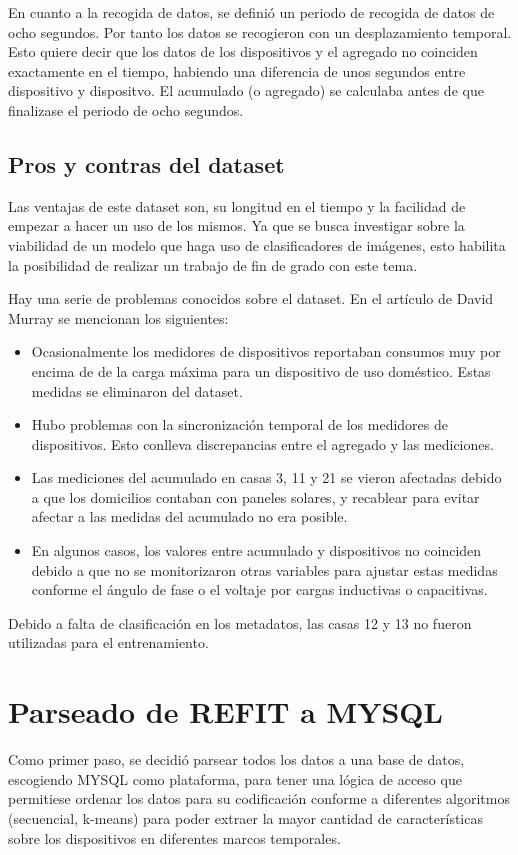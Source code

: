 En cuanto a la recogida de datos, se definió un periodo de recogida de datos de ocho segundos. Por tanto los datos se recogieron con un desplazamiento temporal. Esto quiere decir que los datos de los dispositivos y el agregado no coinciden exactamente en el tiempo, habiendo una diferencia de unos segundos entre dispositivo y dispositvo. El acumulado (o agregado) se calculaba antes de que finalizase el periodo de ocho segundos.


\subsection{Pros y contras del dataset}

Las ventajas de este dataset son, su longitud en el tiempo y la facilidad de empezar a hacer un uso de los mismos. Ya que se busca investigar sobre la viabilidad de un modelo que haga uso de clasificadores de imágenes, esto habilita la posibilidad de realizar un trabajo de fin de grado con este tema. 

Hay una serie de problemas conocidos sobre el dataset. En el artículo de David Murray \autocite{REFIT} se mencionan los siguientes:
\begin{itemize}
    \item Ocasionalmente los medidores de dispositivos reportaban consumos muy por encima de de la carga máxima para un dispositivo de uso doméstico. Estas medidas se eliminaron del dataset.
    \item Hubo problemas con la sincronización temporal de los medidores de dispositivos. Esto conlleva discrepancias entre el agregado y las mediciones.
    \item Las mediciones del acumulado en casas 3, 11 y 21 se vieron afectadas debido a que los domicilios contaban con paneles solares, y recablear para evitar afectar a las medidas del acumulado no era posible.
    \item En algunos casos, los valores entre acumulado y dispositivos no coinciden debido a que no se monitorizaron otras variables para ajustar estas medidas conforme el ángulo de fase o el voltaje por cargas inductivas o capacitivas.
\end{itemize}

Debido a falta de clasificación en los metadatos, las casas 12 y 13 no fueron utilizadas para el entrenamiento.

\section{Parseado de REFIT a MYSQL}
Como primer paso, se decidió parsear todos los datos a una base de datos, escogiendo MYSQL como plataforma, para tener una lógica de acceso que permitiese ordenar los datos para su codificación conforme a diferentes algoritmos (secuencial, k-means) para poder extraer la mayor cantidad de características sobre los dispositivos en diferentes marcos temporales.

